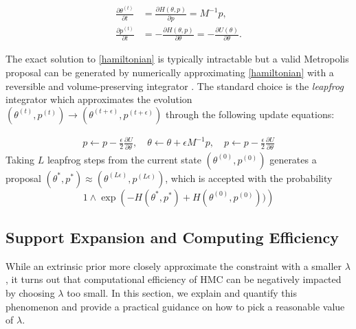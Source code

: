 \documentclass[10pt]{article}
\DeclareMathOperator{\1}{\mathbbm{1}}
\newcommand{\dt}{\epsilon} %
\newcommand{\mass}{M} %
\begin{document}
\begin{equation}
\begin{aligned}
\label{hamiltonian}
\frac{\partial \theta ^{(t)}}{\partial t} & =\frac{\partial H(\theta, p)}{\partial p} = \mass^{-1}p,\\
\frac{\partial p^{(t)}}{\partial t}& =-\frac{\partial H(\theta, p)}{\partial \theta} = -\frac{\partial U(\theta)}{\partial \theta}.
\end{aligned}
\end{equation}

The exact solution to \eqref{hamiltonian} is typically intractable but a valid Metropolis proposal can be generated by numerically approximating \eqref{hamiltonian} with a reversible and volume-preserving  integrator \citep{neal2011mcmc}. The standard choice is the \textit{leapfrog} integrator which approximates the evolution $(\theta^{(t)},p^{(t)}) \to (\theta^{(t + \dt)},p^{(t + \dt)})$ through the following update equations:

\begin{equation}
\begin{aligned}
\label{leap-frog}
p \leftarrow p - \frac{\dt}{2} \frac{\partial U}{\partial  \theta },\quad
\theta \leftarrow  \theta  + \dt \mass^{-1}p,\quad
p \leftarrow p -  \frac{\dt}{2}  \frac{\partial U}{\partial  \theta } 
\end{aligned}
\end{equation}
Taking $L$ leapfrog steps from the current state $(\theta^{(0)},p^{(0)})$ generates a proposal $(\theta^{*},p^{*}) \approx (\theta^{(L \dt)},p^{(L \dt)})$, which is accepted with the probability 
$$1\wedge \exp  \left( - H(\theta^{*},p^{*}) + H(\theta^{(0)},p^{(0)}))\right)$$


\subsection{Support Expansion and Computing Efficiency}

While an extrinsic prior more closely approximate the constraint with a smaller $\lambda$, it turns out that computational efficiency of HMC can be negatively impacted by choosing $\lambda$ too small. In this section, we explain and quantify this phenomenon and provide a practical guidance on how to pick a reasonable value of $\lambda$.
\end{document}
